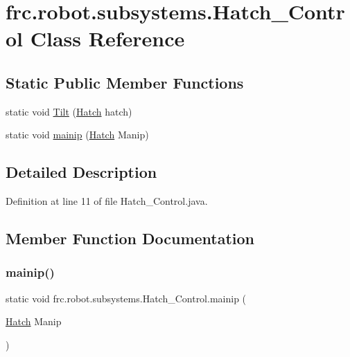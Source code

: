 \hypertarget{classfrc_1_1robot_1_1subsystems_1_1Hatch__Control}{}\section{frc.\+robot.\+subsystems.\+Hatch\+\_\+\+Control Class Reference}
\label{classfrc_1_1robot_1_1subsystems_1_1Hatch__Control}
\subsection*{Static Public Member Functions}
\begin{DoxyCompactItemize}
\item 
static void \hyperlink{classfrc_1_1robot_1_1subsystems_1_1Hatch__Control_a10439efd71fc486d24b95364d70dcde3}{Tilt} (\hyperlink{enumfrc_1_1robot_1_1Enums_1_1Hatch}{Hatch} hatch)
\item 
static void \hyperlink{classfrc_1_1robot_1_1subsystems_1_1Hatch__Control_a902c47bda22ebf4421953aafbc76128e}{mainip} (\hyperlink{enumfrc_1_1robot_1_1Enums_1_1Hatch}{Hatch} Manip)
\end{DoxyCompactItemize}


\subsection{Detailed Description}


Definition at line 11 of file Hatch\+\_\+\+Control.\+java.



\subsection{Member Function Documentation}
\mbox{\label{classfrc_1_1robot_1_1subsystems_1_1Hatch__Control_a902c47bda22ebf4421953aafbc76128e}} 
\subsubsection{\texorpdfstring{mainip()}{mainip()}}
{\footnotesize\ttfamily static void frc.\+robot.\+subsystems.\+Hatch\+\_\+\+Control.\+mainip (\begin{DoxyParamCaption}\item[{\hyperlink{enumfrc_1_1robot_1_1Enums_1_1Hatch}{Hatch}}]{Manip }\end{DoxyParamCaption})\hspace{0.3cm}{\ttfamily [static]}}




